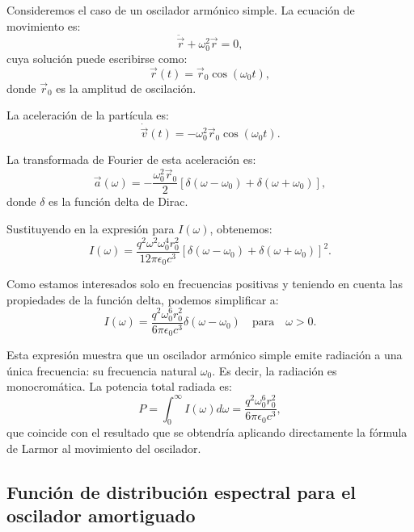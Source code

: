 \documentclass[12pt,a4paper]{book}
\begin{document}
Consideremos el caso de un oscilador armónico simple. La ecuación de movimiento es:
\begin{equation}
\ddot{\vec{r}} + \omega_0^2\vec{r} = 0,
\end{equation}
cuya solución puede escribirse como:
\begin{equation}
\vec{r}(t) = \vec{r}_0\cos(\omega_0t),
\end{equation}
donde $\vec{r}_0$ es la amplitud de oscilación.

La aceleración de la partícula es:
\begin{equation}
\dot{\vec{v}}(t) = -\omega_0^2\vec{r}_0\cos(\omega_0t).
\end{equation}

La transformada de Fourier de esta aceleración es:
\begin{equation}
\vec{a}(\omega) = -\frac{\omega_0^2\vec{r}_0}{2}\left[\delta(\omega - \omega_0) + \delta(\omega + \omega_0)\right],
\end{equation}
donde $\delta$ es la función delta de Dirac.

Sustituyendo en la expresión para $I(\omega)$, obtenemos:
\begin{equation}
I(\omega) = \frac{q^2\omega^2\omega_0^4r_0^2}{12\pi\epsilon_0c^3}\left[\delta(\omega - \omega_0) + \delta(\omega + \omega_0)\right]^2.
\end{equation}

Como estamos interesados solo en frecuencias positivas y teniendo en cuenta las propiedades de la función delta, podemos simplificar a:
\begin{equation}
I(\omega) = \frac{q^2\omega_0^6r_0^2}{6\pi\epsilon_0c^3}\delta(\omega - \omega_0) \quad \text{para} \quad \omega > 0.
\end{equation}

Esta expresión muestra que un oscilador armónico simple emite radiación a una única frecuencia: su frecuencia natural $\omega_0$. Es decir, la radiación es monocromática. La potencia total radiada es:
\begin{equation}
P = \int_0^{\infty}I(\omega)d\omega = \frac{q^2\omega_0^6r_0^2}{6\pi\epsilon_0c^3},
\end{equation}
que coincide con el resultado que se obtendría aplicando directamente la fórmula de Larmor al movimiento del oscilador.

\subsection{Función de distribución espectral para el oscilador amortiguado}
\end{document}
